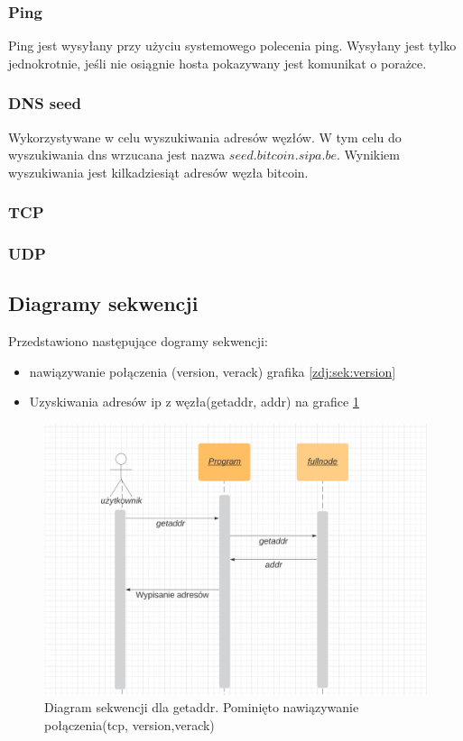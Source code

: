 \subsubsection{Ping}
Ping jest wysyłany przy użyciu systemowego polecenia ping. Wysyłany jest tylko jednokrotnie, jeśli nie osiągnie hosta pokazywany jest komunikat o porażce.
\subsubsection{DNS seed}
Wykorzystywane w celu wyszukiwania adresów węzłów. W tym celu do wyszukiwania dns wrzucana jest nazwa $seed.bitcoin.sipa.be$. Wynikiem wyszukiwania jest kilkadziesiąt adresów węzła bitcoin.

\subsubsection{TCP}
\subsubsection{UDP}
\subsection{Diagramy sekwencji}
Przedstawiono następujące dogramy sekwencji:
\begin{itemize}
\item nawiązywanie połączenia (version, verack) grafika \ref{zdj:sek:version}
\item Uzyskiwania adresów ip z węzła(getaddr, addr) na grafice \ref{zdj:sek:getaddr}
\end{itemize}

\begin{figure}

\caption{Diagram sekwencji dla getaddr. Pominięto nawiązywanie połączenia(tcp, version,verack)}
\label{zdj:sek:getaddr}
\centering
\includegraphics[width=\textwidth]{zdjecia/sekwencjiGetAddr}
\end{figure}

